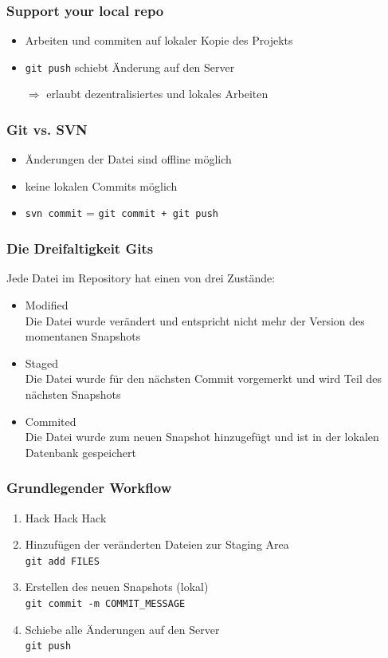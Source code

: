 \documentclass[12pt,utf8]{beamer}
\begin{document}
	\begin{frame}
		\frametitle{Support your local repo}
		\begin{itemize}
			\item Arbeiten und commiten auf lokaler Kopie des Projekts
			\item \texttt{git push} schiebt Änderung auf den Server
			\item[$\Rightarrow$] erlaubt dezentralisiertes und lokales Arbeiten 
		\end{itemize}
	\end{frame}
	
	\begin{frame}
		\frametitle{Git vs. SVN}
		\begin{itemize}
			\item Änderungen der Datei sind offline möglich
			\item keine lokalen Commits möglich
			\item \texttt{svn commit} = \texttt{git commit + git push}
		\end{itemize}
	\end{frame}

	\begin{frame}
		\frametitle{Die Dreifaltigkeit Gits}
		Jede Datei im Repository hat einen von drei Zustände:
		\begin{itemize}
			\item Modified\\
				Die Datei wurde verändert und entspricht nicht mehr der Version des momentanen Snapshots
			\item Staged\\
				Die Datei wurde für den nächsten Commit vorgemerkt und wird Teil des nächsten Snapshots
			\item Commited\\
				Die Datei wurde zum neuen Snapshot hinzugefügt und ist in der lokalen Datenbank gespeichert
		\end{itemize}
	\end{frame}

	\begin{frame}
		\frametitle{Grundlegender Workflow}
		\begin{enumerate}
			\item Hack Hack Hack
			\item Hinzufügen der veränderten Dateien zur Staging Area\\
				\texttt{git add FILES}
			\item Erstellen des neuen Snapshots (lokal)\\
				\texttt{git commit -m COMMIT\_MESSAGE}
			\item Schiebe alle Änderungen auf den Server\\
				\texttt{git push}
		\end{enumerate}
	\end{frame}
\end{document}
